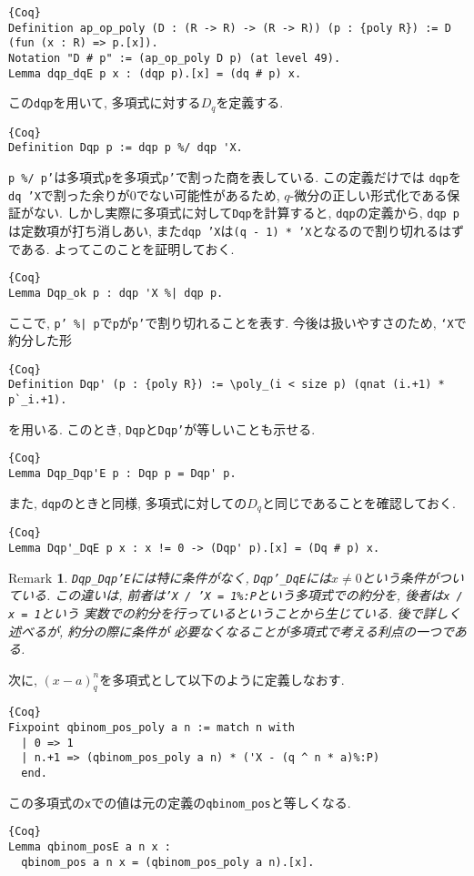 \documentclass[11pt]{jsreport}
\theoremstyle{mystyle}
\newtheorem{rmk}[df]{$\textrm{Remark}$}
\newcommand{\brmk}{\begin{rmk}}
\newcommand{\ermk}{\end{rmk}}
\newcommand{\0}{\textbf{0}}
\newcommand{\1}{\textbf{1}}
\newcommand{\2}{\textbf{2}}
\begin{document}
\begin{lstlisting}{Coq}
Definition ap_op_poly (D : (R -> R) -> (R -> R)) (p : {poly R}) := D (fun (x : R) => p.[x]).
Notation "D # p" := (ap_op_poly D p) (at level 49).
Lemma dqp_dqE p x : (dqp p).[x] = (dq # p) x. \end{lstlisting}
この{\tt dqp}を用いて, 多項式に対する$D_q$を定義する. 
\begin{lstlisting}{Coq}
Definition Dqp p := dqp p %/ dqp 'X.
\end{lstlisting}
{\tt p \%/ p'}は多項式{\tt p}を多項式{\tt p'}で割った商を表している. この定義だけでは
{\tt dqp}を{\tt dq 'X}で割った余りが$0$でない可能性があるため, $q$-微分の正しい形式化である保証がない. しかし実際に多項式に対して{\tt Dqp}を計算すると, {\tt dqp}の定義から, {\tt dqp p}は定数項が打ち消しあい, また{\tt dqp 'X}は{\tt (q - 1) * 'X}となるので割り切れるはずである. 
よってこのことを証明しておく.  
\begin{lstlisting}{Coq}
Lemma Dqp_ok p : dqp 'X %| dqp p.
\end{lstlisting}
ここで, {\tt p' \%| p}で{\tt p}が{\tt p'}で割り切れることを表す. 
今後は扱いやすさのため, {\tt `X}で約分した形
\begin{lstlisting}{Coq}
Definition Dqp' (p : {poly R}) := \poly_(i < size p) (qnat (i.+1) * p`_i.+1).
\end{lstlisting}
を用いる. このとき, {\tt Dqp}と{\tt Dqp'}が等しいことも示せる. 
\begin{lstlisting}{Coq}
Lemma Dqp_Dqp'E p : Dqp p = Dqp' p. \end{lstlisting}
また, {\tt dqp}のときと同様, 多項式に対しての$D_q$と同じであることを確認しておく. 
\begin{lstlisting}{Coq}
Lemma Dqp'_DqE p x : x != 0 -> (Dqp' p).[x] = (Dq # p) x. \end{lstlisting}
\brmk
  {\tt Dqp\_Dqp'E}には特に条件がなく, {\tt Dqp'\_DqE}には$x \neq 0$という条件がついている. 
  この違いは, 前者は{\tt 'X / 'X = 1\%:P}という多項式での約分を, 後者は{\tt x / x = 1}という
  実数での約分を行っているということから生じている. 後で詳しく述べるが, 約分の際に条件が
  必要なくなることが多項式で考える利点の一つである. 
\ermk
次に, $(x - a)^n_q$を多項式として以下のように定義しなおす. 
\begin{lstlisting}{Coq}
Fixpoint qbinom_pos_poly a n := match n with
  | 0 => 1
  | n.+1 => (qbinom_pos_poly a n) * ('X - (q ^ n * a)%:P)
  end. \end{lstlisting}
この多項式の{\tt x}での値は元の定義の{\tt qbinom\_pos}と等しくなる. 
\begin{lstlisting}{Coq}
Lemma qbinom_posE a n x :
  qbinom_pos a n x = (qbinom_pos_poly a n).[x].
\end{lstlisting}
\end{document}
